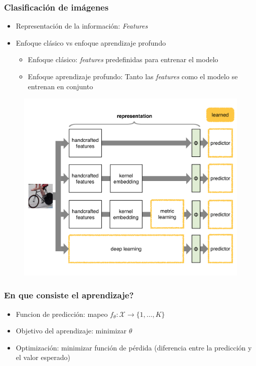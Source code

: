 \documentclass[10pt,center]{beamer}
\begin{document}
\begin{frame}
  \frametitle{Clasificación de imágenes}
  \begin{itemize}
    \item Representación de la información: \textit{Features}
    \item Enfoque clásico vs enfoque aprendizaje profundo
    \begin{itemize}
      \item Enfoque clásico: \textit{features} predefinidas para entrenar el modelo
      \item Enfoque aprendizaje profundo: Tanto las \textit{features} como el modelo se entrenan en conjunto
    \end{itemize}
  \end{itemize}
  \begin{figure}[h]
    \begin{center}
	    \includegraphics[height=0.6\textheight]{./img/vedaldi_shallow_deep.pdf}
    \end{center}
  \end{figure}
\end{frame}

\begin{frame}
  \frametitle{En que consiste el aprendizaje?}
  \begin{itemize}
    \item Funcion de predicción: mapeo $f_{\theta}: \mathcal{X} {\rightarrow} \{1,\dots,K\}$
    \item Objetivo del aprendizaje: minimizar $\theta$
    \item Optimización: minimizar función de pérdida (diferencia entre la predicción y el valor esperado)
  \end{itemize}
\end{frame}
\end{document}
